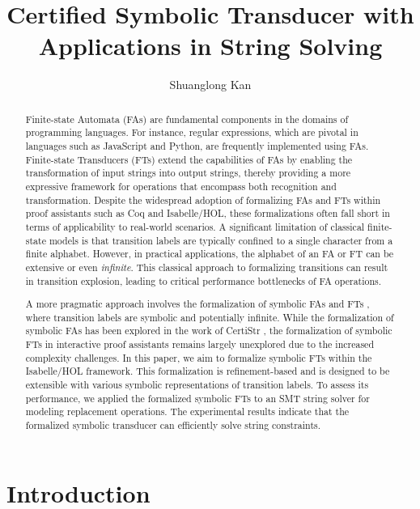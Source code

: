 \documentclass[a4paper,UKenglish,cleveref, autoref, anonymous, thm-restate]{lipics-v2021}
\title{Certified Symbolic Transducer with Applications in String Solving} %
\author{Shuanglong Kan}{Barkhausen Institut, Germany \and \url{https://github.com/ShlKan} }{shuanglongkan@gmail.com}{https://orcid.org/0000-0002-1825-0097}{(Optional) author-specific funding acknowledgements}%
\begin{document}
\maketitle

\begin{abstract}
Finite-state Automata (FAs) are fundamental components in the domains of programming languages. For instance, regular expressions, which are pivotal in languages such as JavaScript and Python, are frequently implemented using FAs.
%
Finite-state Transducers (FTs) extend the capabilities of FAs by enabling the transformation of input strings into output strings, thereby providing a more expressive framework for operations that encompass both recognition and transformation. Despite the widespread adoption of formalizing FAs and FTs within proof assistants such as Coq and Isabelle/HOL, these formalizations often fall short in terms of applicability to real-world scenarios. A significant limitation of classical finite-state models is that transition labels are typically confined to a single character from a finite alphabet. However, in practical applications, the alphabet of an FA or FT can be extensive or even \emph{infinite}. This classical approach to formalizing transitions can result in transition explosion, leading to critical performance bottlenecks of FA operations.

A more pragmatic approach involves the formalization of symbolic FAs \cite{cav/DAntoniV17} and FTs \cite{VeanesHLMB12Transducer}, where transition labels are symbolic and potentially infinite. While the formalization of symbolic FAs has been explored in the work of CertiStr \cite{cpp/KanLRS22}, the formalization of symbolic FTs in interactive proof assistants remains largely unexplored due to the increased complexity challenges.
%
In this paper, we aim to formalize symbolic FTs within the Isabelle/HOL framework. This formalization is refinement-based and is designed to be extensible with various symbolic representations of transition labels. To assess its performance, we applied the formalized symbolic FTs to an SMT string solver for modeling replacement operations. The experimental results indicate that the formalized symbolic transducer can efficiently solve string constraints.


\end{abstract}

\section{Introduction}
\label{sec:introduction}
\end{document}
